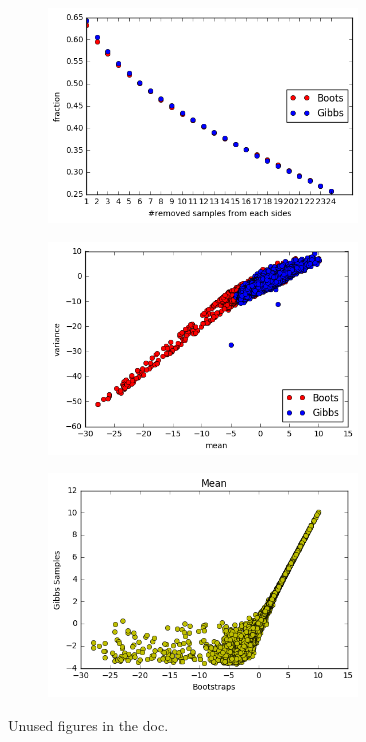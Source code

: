 \documentclass{article}
\begin{document}
\begin{figure}
  \centering
  \begin{subfigure}[t]{0.30\textwidth}
    \centering
    \includegraphics[width=0.9\textwidth]{figures/subsample.png}
    \caption{ \label{fig:subsample}}
  \end{subfigure}
  \qquad
  \begin{subfigure}[t]{0.30\textwidth}
    \centering
      \includegraphics[width=0.9\textwidth]{figures/meanVvar.png}
      \caption{\label{fig:meanVvar}}
  \end{subfigure}
  \qquad
  \begin{subfigure}[t]{0.30\textwidth}
    \centering
      \includegraphics[width=0.9\textwidth]{figures/mean.png}
      \caption{\label{fig:mean}}
  \end{subfigure}
  \caption{Unused figures in the doc.}
\end{figure}
\end{document}
